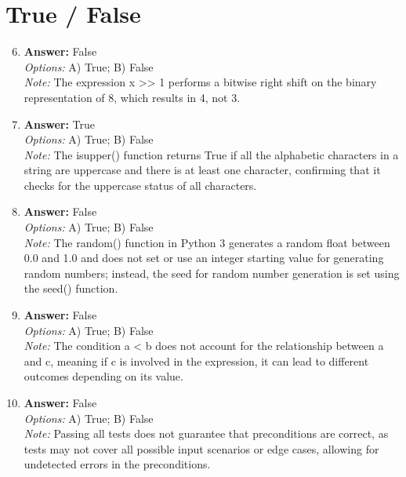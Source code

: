 \documentclass[12pt]{article}
\begin{document}
\section*{True / False}
\begin{enumerate}[label=\arabic*.]
\setcounter{enumi}{5}
\item \textbf{Answer:} False
\\ \textit{Options:} A) True; B) False
\\ \textit{Note:} The expression x \textgreater{}\textgreater{} 1 performs a bitwise right shift on the binary representation of 8, which results in 4, not 3.
\item \textbf{Answer:} True
\\ \textit{Options:} A) True; B) False
\\ \textit{Note:} The isupper() function returns True if all the alphabetic characters in a string are uppercase and there is at least one character, confirming that it checks for the uppercase status of all characters.
\item \textbf{Answer:} False
\\ \textit{Options:} A) True; B) False
\\ \textit{Note:} The random() function in Python 3 generates a random float between 0.0 and 1.0 and does not set or use an integer starting value for generating random numbers; instead, the seed for random number generation is set using the seed() function.
\item \textbf{Answer:} False
\\ \textit{Options:} A) True; B) False
\\ \textit{Note:} The condition a \textless{} b does not account for the relationship between a and c, meaning if c is involved in the expression, it can lead to different outcomes depending on its value.
\item \textbf{Answer:} False
\\ \textit{Options:} A) True; B) False
\\ \textit{Note:} Passing all tests does not guarantee that preconditions are correct, as tests may not cover all possible input scenarios or edge cases, allowing for undetected errors in the preconditions.
\end{enumerate}
\end{document}
